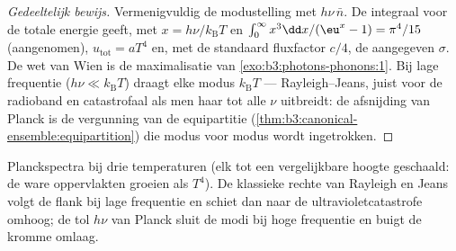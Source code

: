 \begin{proof}[Gedeeltelijk bewijs]
Vermenigvuldig de modustelling met $h\nu\,\bar n$. De integraal voor de
totale energie geeft, met $x = h\nu/k_{\text{B}}T$ en $\int_0^\infty
x^3\dd x/(\eu^x - 1) = \pi^4/15$ (aangenomen), $u_{\text{tot}}
= aT^4$ en,
met de standaard fluxfactor $c/4$, de aangegeven $\sigma$. De wet van Wien
is de maximalisatie van \cref{exo:b3:photons-phonons:1}. Bij lage
frequentie ($h\nu \ll
k_{\text{B}}T$) draagt elke modus $k_{\text{B}}T$ ---
Rayleigh--Jeans, juist voor de radioband en catastrofaal als men haar tot
alle $\nu$ uitbreidt: de afsnijding van Planck is de vergunning van de
equipartitie (\cref{thm:b3:canonical-ensemble:equipartition}) die modus
voor modus wordt ingetrokken.
\end{proof}

\begin{omfigure}

{\small Planckspectra bij drie temperaturen (elk tot een vergelijkbare
hoogte geschaald: de ware oppervlakten groeien als $T^4$). De klassieke
rechte van Rayleigh en Jeans volgt de flank bij lage frequentie en schiet
dan naar de ultravioletcatastrofe omhoog; de tol $h\nu$ van Planck sluit
de modi bij hoge frequentie en buigt de kromme omlaag.}
\end{omfigure}

